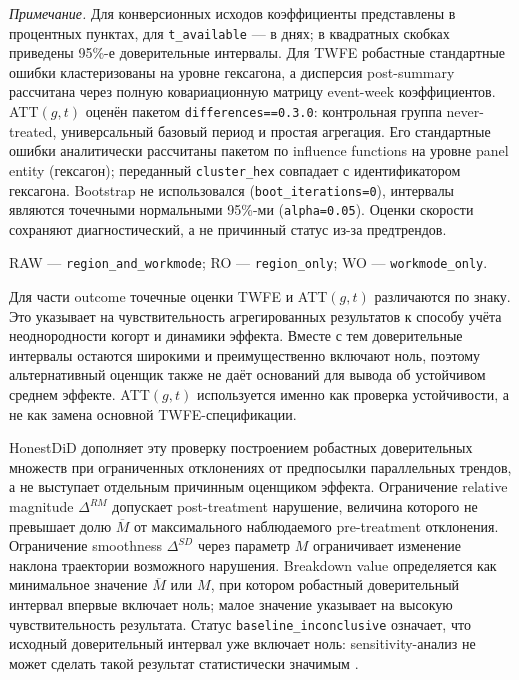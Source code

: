 \documentclass[14pt,a4paper]{extarticle}
\begin{document}
\begin{table}[H]
\begin{minipage}{0.98\textwidth}
\scriptsize
\textit{Примечание.} Для конверсионных исходов коэффициенты представлены в
процентных пунктах, для \texttt{t\_available} --- в днях; в квадратных скобках
приведены 95\%-е доверительные интервалы. Для TWFE робастные стандартные ошибки
кластеризованы на уровне гексагона, а дисперсия post-summary рассчитана через
полную ковариационную матрицу event-week коэффициентов. ATT\((g,t)\) оценён
пакетом \texttt{differences==0.3.0}: контрольная группа never-treated,
универсальный базовый период и простая агрегация. Его стандартные ошибки
аналитически рассчитаны пакетом по influence functions на уровне panel entity
(гексагон); переданный \texttt{cluster\_hex} совпадает с идентификатором
гексагона. Bootstrap не использовался (\texttt{boot\_iterations=0}), интервалы
являются точечными нормальными 95\%-ми (\texttt{alpha=0.05}). Оценки скорости
сохраняют диагностический, а не причинный статус из-за предтрендов.
\end{minipage}
\end{table}

\begin{small}
\noindent RAW --- \texttt{region\_and\_workmode}; RO --- \texttt{region\_only}; WO --- \texttt{workmode\_only}.
\end{small}

Для части outcome точечные оценки TWFE и ATT\((g,t)\) различаются по знаку. Это указывает на чувствительность агрегированных результатов к способу учёта неоднородности когорт и динамики эффекта. Вместе с тем доверительные интервалы остаются широкими и преимущественно включают ноль, поэтому альтернативный оценщик также не даёт оснований для вывода об устойчивом среднем эффекте. ATT\((g,t)\) используется именно как проверка устойчивости, а не как замена основной TWFE-спецификации.

HonestDiD дополняет эту проверку построением робастных доверительных множеств при ограниченных отклонениях от предпосылки параллельных трендов, а не выступает отдельным причинным оценщиком эффекта. Ограничение relative magnitude \(\Delta^{RM}\) допускает post-treatment нарушение, величина которого не превышает долю \(\overline{M}\) от максимального наблюдаемого pre-treatment отклонения. Ограничение smoothness \(\Delta^{SD}\) через параметр \(M\) ограничивает изменение наклона траектории возможного нарушения. Breakdown value определяется как минимальное значение \(\overline{M}\) или \(M\), при котором робастный доверительный интервал впервые включает ноль; малое значение указывает на высокую чувствительность результата. Статус \texttt{baseline\_\allowbreak inconclusive} означает, что исходный доверительный интервал уже включает ноль: sensitivity-анализ не может сделать такой результат статистически значимым \cite{rambachan2023credible}.
\end{document}
